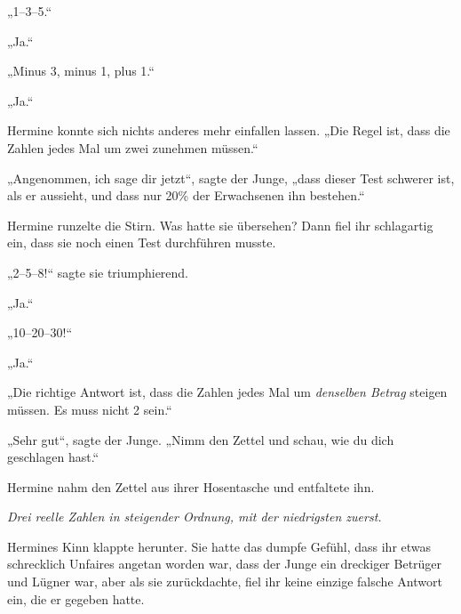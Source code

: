 „1–3–5.“

„Ja.“

„Minus 3, minus 1, plus 1.“

„Ja.“

Hermine konnte sich nichts anderes mehr einfallen lassen.
„Die Regel ist, dass die Zahlen jedes Mal um zwei zunehmen müssen.“

„Angenommen, ich sage dir jetzt“, sagte der Junge, „dass dieser Test schwerer ist, als er aussieht, und dass nur 20\% der Erwachsenen ihn bestehen.“

Hermine runzelte die Stirn. Was hatte sie übersehen? Dann fiel ihr schlagartig ein, dass sie noch einen Test durchführen musste.

„2–5–8!“ sagte sie triumphierend.

„Ja.“

„10–20–30!“

„Ja.“

„Die richtige Antwort ist, dass die Zahlen jedes Mal um \emph{denselben Betrag} steigen müssen. Es muss nicht 2 sein.“

„Sehr gut“, sagte der Junge.
„Nimm den Zettel und schau, wie du dich geschlagen hast.“

Hermine nahm den Zettel aus ihrer Hosentasche und entfaltete ihn.

\emph{Drei reelle Zahlen in steigender Ordnung, mit der niedrigsten zuerst.}

Hermines Kinn klappte herunter. Sie hatte das dumpfe Gefühl, dass ihr etwas schrecklich Unfaires angetan worden war, dass der Junge ein dreckiger Betrüger und Lügner war, aber als sie zurückdachte, fiel ihr keine einzige falsche Antwort ein, die er gegeben hatte.

